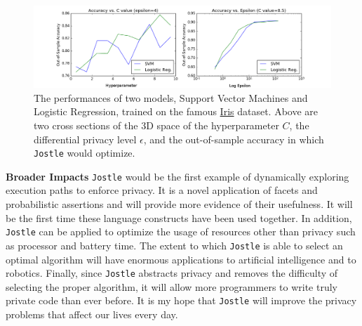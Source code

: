 \documentclass[10.5pt]{article}
\begin{document}
\begin{figure}
\begin{center}
\includegraphics[scale=0.45]{PASS3.png}
\end{center}
\caption{The performances of two models, Support Vector Machines and Logistic Regression, trained on the famous \href{http://archive.ics.uci.edu/ml/datasets/Iris}{Iris} dataset. Above are two cross sections of the 3D space of the hyperparameter $C$, the differential privacy level $\epsilon$, and the out-of-sample accuracy in which \texttt{Jostle} would optimize.}
\label{fig:2}
\end{figure}
\textbf{Broader Impacts} \quad \texttt{Jostle} would be the first example of dynamically exploring execution paths to enforce privacy. It is a novel application of facets and probabilistic assertions and will provide more evidence of their usefulness. It will be the first time these language constructs have been used together. In addition, \texttt{Jostle} can be applied to optimize the usage of resources other than privacy such as processor and battery time. The extent to which \texttt{Jostle} is able to select an optimal algorithm will have enormous applications to artificial intelligence and to robotics. Finally, since \texttt{Jostle} abstracts privacy and removes the difficulty of selecting the proper algorithm, it will allow more programmers to write truly private code than ever before. It is my hope that \texttt{Jostle} will improve the privacy problems that affect our lives every day.


{\footnotesize
}
\end{document}
